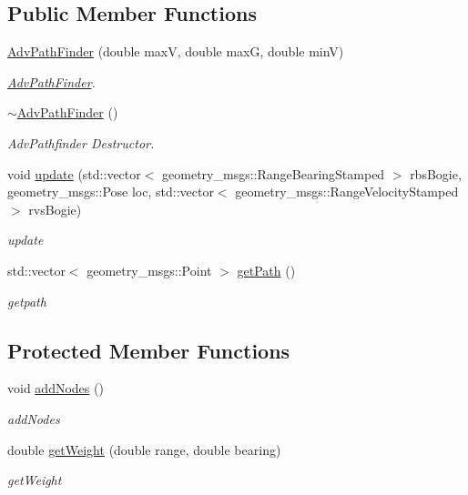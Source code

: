 \subsection*{Public Member Functions}
\begin{DoxyCompactItemize}
\item 
\hyperlink{classAdvPathFinder_a005828035fc0746ca24122f1a1757296}{Adv\+Path\+Finder} (double maxV, double maxG, double minV)
\begin{DoxyCompactList}\small\item\em \hyperlink{classAdvPathFinder}{Adv\+Path\+Finder}. \end{DoxyCompactList}\item 
\mbox{\label{classAdvPathFinder_adbaf47458b5fed9388f0ef39c4036d12}} 
\hyperlink{classAdvPathFinder_adbaf47458b5fed9388f0ef39c4036d12}{$\sim$\+Adv\+Path\+Finder} ()
\begin{DoxyCompactList}\small\item\em Adv\+Pathfinder Destructor. \end{DoxyCompactList}\item 
void \hyperlink{classAdvPathFinder_a0bb7bde4744fa269a172a1d57018462b}{update} (std\+::vector$<$ geometry\+\_\+msgs\+::\+Range\+Bearing\+Stamped $>$ rbs\+Bogie, geometry\+\_\+msgs\+::\+Pose loc, std\+::vector$<$ geometry\+\_\+msgs\+::\+Range\+Velocity\+Stamped $>$ rvs\+Bogie)
\begin{DoxyCompactList}\small\item\em update \end{DoxyCompactList}\item 
std\+::vector$<$ geometry\+\_\+msgs\+::\+Point $>$ \hyperlink{classAdvPathFinder_a4abff5170d4b63a4fa98262d90e14f32}{get\+Path} ()
\begin{DoxyCompactList}\small\item\em getpath \end{DoxyCompactList}\end{DoxyCompactItemize}
\subsection*{Protected Member Functions}
\begin{DoxyCompactItemize}
\item 
void \hyperlink{classAdvPathFinder_a19f90eb8b0322c8cab8c7c94d9da45fa}{add\+Nodes} ()
\begin{DoxyCompactList}\small\item\em add\+Nodes \end{DoxyCompactList}\item 
double \hyperlink{classAdvPathFinder_ae213e34f7092c587d40afd8f316c31eb}{get\+Weight} (double range, double bearing)
\begin{DoxyCompactList}\small\item\em get\+Weight \end{DoxyCompactList}\end{DoxyCompactItemize}
